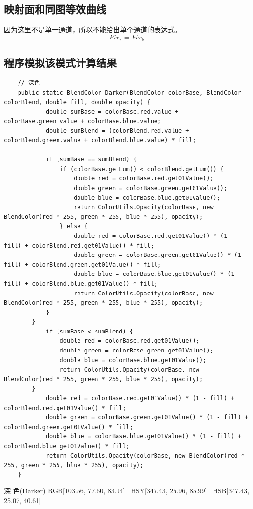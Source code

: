 \subsection{ 映射面和同图等效曲线}

因为这里不是单一通道，所以不能给出单个通道的表达式。
\begin{equation}Pix_r=Pix_b\end{equation}
\newpage
\subsection{ 程序模拟该模式计算结果}

\begin{lstlisting}
	// 深色
	public static BlendColor Darker(BlendColor colorBase, BlendColor colorBlend, double fill, double opacity) {
			double sumBase = colorBase.red.value + colorBase.green.value + colorBase.blue.value;
			double sumBlend = (colorBlend.red.value + colorBlend.green.value + colorBlend.blue.value) * fill;
		
			if (sumBase == sumBlend) {
				if (colorBase.getLum() < colorBlend.getLum()) {
					double red = colorBase.red.get01Value();
					double green = colorBase.green.get01Value();
					double blue = colorBase.blue.get01Value();
					return ColorUtils.Opacity(colorBase, new BlendColor(red * 255, green * 255, blue * 255), opacity);
				} else {
				    double red = colorBase.red.get01Value() * (1 - fill) + colorBlend.red.get01Value() * fill;
					double green = colorBase.green.get01Value() * (1 - fill) + colorBlend.green.get01Value() * fill;
					double blue = colorBase.blue.get01Value() * (1 - fill) + colorBlend.blue.get01Value() * fill;
					return ColorUtils.Opacity(colorBase, new BlendColor(red * 255, green * 255, blue * 255), opacity);
			}
		}
			if (sumBase < sumBlend) {
				double red = colorBase.red.get01Value();
				double green = colorBase.green.get01Value();
				double blue = colorBase.blue.get01Value();
				return ColorUtils.Opacity(colorBase, new BlendColor(red * 255, green * 255, blue * 255), opacity);
		}
			double red = colorBase.red.get01Value() * (1 - fill) + colorBlend.red.get01Value() * fill;
			double green = colorBase.green.get01Value() * (1 - fill) + colorBlend.green.get01Value() * fill;
			double blue = colorBase.blue.get01Value() * (1 - fill) + colorBlend.blue.get01Value() * fill;
			return ColorUtils.Opacity(colorBase, new BlendColor(red * 255, green * 255, blue * 255), opacity);
	}
\end{lstlisting}

\begin{result}
\item 深    色(Darker)        RGB[103.56,  77.60,  83.04]~ HSY[347.43,  25.96,  85.99]~ HSB[347.43,  25.07,  40.61]
\end{result}
\newpage
